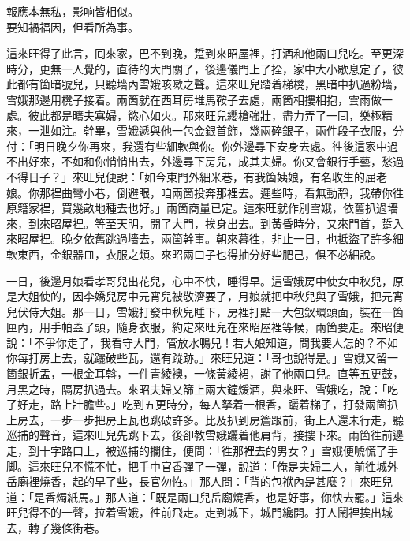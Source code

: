 \begin{myquote}
報應本無私，影响皆相似。\\要知禍福因，但看所為事。
\end{myquote}

這來旺得了此言，囘來家，巴不到晚，踅到來昭屋裡，打酒和他兩口兒吃。至更深時分，更無一人覺的，直待的大門關了，後邊儀門上了拴，家中大小歇息定了，彼此都有箇暗號兒，只聽墻內雪娥咳嗽之聲。這來旺兒踏着梯櫈，黑暗中扒過粉墻，雪娥那邊用櫈子接着。兩箇就在西耳房堆馬鞍子去處，兩箇相摟相抱，雲雨做一處。彼此都是曠夫寡婦，慾心如火。那來旺兒纓槍強壯，盡力弄了一囘，樂極精來，一泄如注。幹畢，雪娥遞與他一包金銀首飾，幾兩碎銀子，兩件段子衣服，分付：「明日晚夕你再來，我還有些細軟與你。你外邊尋下安身去處。徃後這家中過不出好來，不如和你悄悄出去，外邊尋下房兒，成其夫婦。你又會銀行手藝，愁過不得日子？」{}來旺兒便說：「如今東門外細米巷，有我箇姨娘，有名收生的屈老娘。你那裡曲彎小巷，倒避眼，咱兩箇投奔那裡去。遲些時，看無動靜，我帶你徃原籍家裡，買幾畝地種去也好。」兩箇商量已定。這來旺就作別雪娥，依舊扒過墻來，到來昭屋裡。等至天明，開了大門，挨身出去。到黃昏時分，又來門首，踅入來昭屋裡。晚夕依舊跳過墻去，兩箇幹事。朝來暮徃，非止一日，也抵盜了許多細軟東西，金銀器皿，衣服之類。來昭兩口子也得抽分好些肥己，俱不必細說。

一日，後邊月娘看孝哥兒出花兒，心中不快，睡得早。這雪娥房中使女中秋兒，原是大姐使的，因李嬌兒房中元宵兒被敬濟要了，月娘就把中秋兒與了雪娥，把元宵兒伏侍大姐。那一日，雪娥打發中秋兒睡下，房裡打點一大包釵環頭面，裝在一箇匣內，用手帕蓋了頭，隨身衣服，約定來旺兒在來昭屋裡等候，兩箇要走。來昭便說：「不爭你走了，我看守大門，管放水鴨兒！若大娘知道，問我要人怎的？不如你每打房上去，就躧破些瓦，還有蹤跡。」來旺兒道：「哥也說得是。」雪娥又留一箇銀折盂，一根金耳斡，一件青綾襖，一條黃綾裙，謝了他兩口兒。直等五更鼓，月黑之時，隔房扒過去。來昭夫婦又篩上兩大鐘煖酒，與來旺、雪娥吃，說：「吃了好走，路上壯膽些。」吃到五更時分，每人拏着一根香，躧着梯子，打發兩箇扒上房去，一步一步把房上瓦也跳破許多。比及扒到房簷跟前，街上人還未行走，聽巡捕的聲音，這來旺兒先跳下去，後卻教雪娥躧着他肩背，接摟下來。兩箇徃前邊走，到十字路口上，被巡捕的攔住，{}便問：「徃那裡去的男女？」雪娥便唬慌了手脚。這來旺兒不慌不忙，把手中官香彈了一彈，說道：「俺是夫婦二人，前徃城外岳廟裡燒香，起的早了些，長官勿恠。」那人問：「背的包袱內是甚麼？」來旺兒道：「是香燭紙馬。」那人道：「既是兩口兒岳廟燒香，也是好事，你快去罷。」這來旺兒得不的一聲，拉着雪娥，徃前飛走。走到城下，城門纔開。打人鬧裡挨出城去，轉了幾條街巷。

